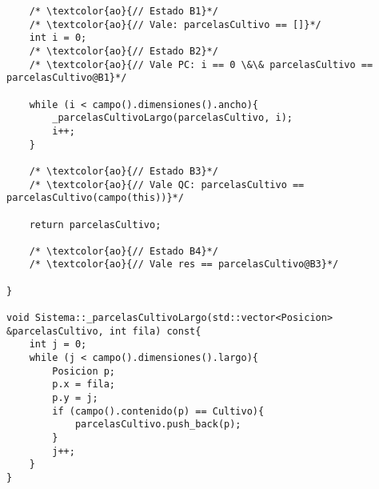 \begin{lstlisting}
	/* \textcolor{ao}{// Estado B1}*/	    
    /* \textcolor{ao}{// Vale: parcelasCultivo == []}*/    
    int i = 0;
	/* \textcolor{ao}{// Estado B2}*/	    
    /* \textcolor{ao}{// Vale PC: i == 0 \&\& parcelasCultivo == parcelasCultivo@B1}*/    
        
    while (i < campo().dimensiones().ancho){
        _parcelasCultivoLargo(parcelasCultivo, i);
        i++;
    }
    
    /* \textcolor{ao}{// Estado B3}*/	    
    /* \textcolor{ao}{// Vale QC: parcelasCultivo == parcelasCultivo(campo(this))}*/    
    
    return parcelasCultivo;
    
    /* \textcolor{ao}{// Estado B4}*/	    
    /* \textcolor{ao}{// Vale res == parcelasCultivo@B3}*/    
    
}

void Sistema::_parcelasCultivoLargo(std::vector<Posicion> &parcelasCultivo, int fila) const{
    int j = 0;
    while (j < campo().dimensiones().largo){
        Posicion p;
        p.x = fila;
        p.y = j;
        if (campo().contenido(p) == Cultivo){
            parcelasCultivo.push_back(p);
        }
        j++;
    }
}


\end{lstlisting}